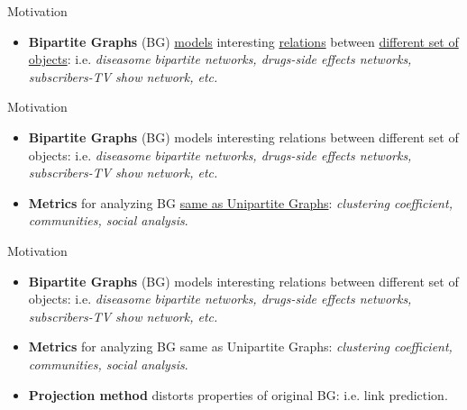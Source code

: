 
\begin{frame}[fragile]{Motivation}
  \begin{itemize}
    \item \textbf{Bipartite Graphs} (BG) \underline{\color{red}models} interesting \underline{\color{red}relations} between \underline{\color{red}different set of objects}: i.e. \emph{diseasome bipartite networks, drugs-side effects networks, subscribers-TV show network, etc.}
  \end{itemize}
\end{frame}

\begin{frame}[fragile]{Motivation}
    \begin{itemize}
      \setlength\itemsep{2em}
      \item {\color{light}\textbf{Bipartite Graphs} (BG) models interesting relations between different set of objects: i.e. \emph{diseasome bipartite networks, drugs-side effects networks, subscribers-TV show network, etc.}}
      \item \textbf{Metrics} for analyzing BG \underline{\color{red}same as Unipartite Graphs}: \emph{clustering coefficient, communities, social analysis}.
    \end{itemize}
\end{frame}

\begin{frame}[fragile]{Motivation}
    \begin{itemize}
      \setlength\itemsep{2em}
      \item {\color{light}\textbf{Bipartite Graphs} (BG) models interesting relations between different set of objects: i.e. \emph{diseasome bipartite networks, drugs-side effects networks, subscribers-TV show network, etc.}}
      \item {\color{light}\textbf{Metrics} for analyzing BG same as Unipartite Graphs: \emph{clustering coefficient, communities, social analysis}.}
      \item \textbf{Projection method} distorts properties of original BG: i.e. link prediction.
    \end{itemize}
\end{frame}

